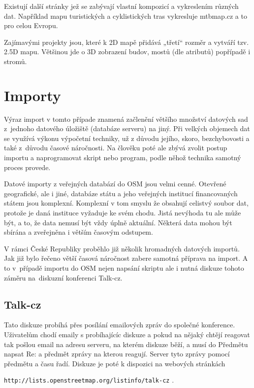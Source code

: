 Existují další stránky jež se zabývají vlastní kompozicí a vykreslením
různých dat. Například mapu turistických a cyklistických tras vykresluje
 mtbmap.cz a to pro celou Evropu. 
 
Zajímavými projekty jsou, které k 2D mapě přidává „třetí“ rozměr a 
vytváří tzv. 2.5D mapu. Většinou jde o 3D zobrazení budov, mostů (dle 
atributů) popřípadě i stromů. 



\section{Importy}
\label{3-Importy}
Výraz import v tomto případe znamená začlenění většího množství datových sad 
z~jednoho datového úložiště (databáze serveru) na jiný. Při velkých objemech dat
se využívá výkonu výpočetní techniky, už z důvodu jejího, skoro, bezchybovosti a
také z~důvodu časové náročnosti. Na člověku poté ale zbývá zvolit postup importu
a naprogramovat skript nebo program, podle něhož technika samotný proces 
provede. 

Datové importy z veřejných databází do OSM jsou velmi cenné. Otevřené 
geografické, ale i jiné, databáze státu a jeho veřejných institucí financovaných
státem jsou komplexní. Komplexní v tom smyslu že obsahují celistvý soubor dat, 
protože je daná instituce vyžaduje ke svém chodu. Jistá nevýhoda tu ale může 
být, a to, že data nemusí být vždy úplně aktuální. Některá data mohou být 
sbírána a zveřejněna i větším časovým odstupem.

V rámci České Republiky proběhlo již několik hromadných datových importů. Jak 
již bylo řečeno větší časová náročnost zabere samotná příprava na import. A to 
v~případě importu do OSM nejen napsání skriptu ale i nutná diskuze tohoto záměru
na~diskuzní konferenci Talk-cz. 

\subsection{Talk-cz}
\label{Talk-cz}
Tato diskuze probíhá přes posílání emailových zpráv do společné konference. 
Uživatelům chodí emaily s probíhajícíc diskuze a pokud na nějaký chtějí reagovat
tak pošlou email na adresu serveru, na kterém diskuze běží, a musí do Předmětu 
napsat Re: a předmět zprávy na kterou reagují. Server tyto zprávy pomocí 
předmětu a času řadí. Diskuze je poté k dispozici na webových stránkách 

{\tt http://lists.openstreetmap.org/listinfo/talk-cz} .

